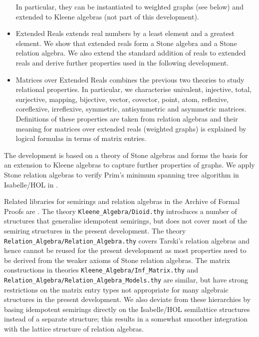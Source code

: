 \documentclass[11pt,a4paper]{article}
\begin{document}
\begin{itemize}
      In particular, they can be instantiated to weighted graphs (see below) and extended to Kleene algebras (not part of this development).
\item Extended Reals extends real numbers by a least element and a greatest element.
      We show that extended reals form a Stone algebra and a Stone relation algebra.
      We also extend the standard addition of reals to extended reals and derive further properties used in the following development.
\item Matrices over Extended Reals combines the previous two theories to study relational properties.
      In particular, we characterise univalent, injective, total, surjective, mapping, bijective, vector, covector, point, atom, reflexive, coreflexive, irreflexive, symmetric, antisymmetric and asymmetric matrices.
      Definitions of these properties are taken from relation algebras and their meaning for matrices over extended reals (weighted graphs) is explained by logical formulas in terms of matrix entries.
\end{itemize}
The development is based on a theory of Stone algebras \cite{Guttmann2016b} and forms the basis for an extension to Kleene algebras to capture further properties of graphs.
We apply Stone relation algebras to verify Prim's minimum spanning tree algorithm in Isabelle/HOL in \cite{Guttmann2016c}.

Related libraries for semirings and relation algebras in the Archive of Formal Proofs are \cite{ArmstrongFosterStruthWeber2016,ArmstrongGomesStruthWeber2016}.
The theory \texttt{Kleene\_Algebra/Dioid.thy} introduces a number of structures that generalise idempotent semirings, but does not cover most of the semiring structures in the present development.
The theory \texttt{Relation\_Algebra/Relation\_Algebra.thy} covers Tarski's relation algebras and hence cannot be reused for the present development as most properties need to be derived from the weaker axioms of Stone relation algebras.
The matrix constructions in theories \texttt{Kleene\_Algebra/Inf\_Matrix.thy} and \texttt{Relation\_Algebra/Relation\_Algebra\_Models.thy} are similar, but have strong restrictions on the matrix entry types not appropriate for many algebraic structures in the present development.
We also deviate from these hierarchies by basing idempotent semirings directly on the Isabelle/HOL semilattice structures instead of a separate structure; this results in a somewhat smoother integration with the lattice structure of relation algebras.

\begin{flushleft}

\end{flushleft}



\end{document}
